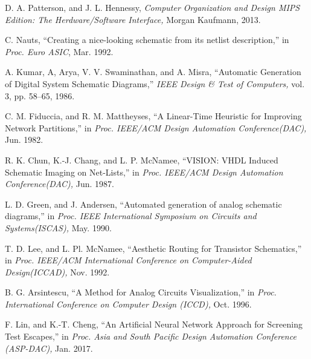 \documentclass[twocolumn]{article}
\makeatletter
\def\section{\@startsection {section}{1}{\z@}{20pt plus 2pt minus 2pt}
{8pt plus 2pt minus 2pt}{\centering\normalsize\sc
\edef\@svsec{\thesection.\ }}}
\def\thesection{\Roman{section}}
\makeatother
\begin{document}

\begin{thebibliography}{99}
\footnotesize

D. A. Patterson, and J. L. Hennessy,
{\em Computer Organization and Design MIPS Edition:
 The Herdware/Software Interface,}
Morgan Kaufmann, 2013.

C. Nauts,
``Creating a nice-looking schematic from its netlist description,''
in {\em Proc. Euro ASIC}, Mar. 1992.

A. Kumar, A, Arya, V. V. Swaminathan, and A. Misra,
``Automatic Generation of Digital System Schematic Diagrams,''
{\em IEEE Design \& Test of Computers,}
vol. 3, pp. 58--65, 1986.

C. M. Fiduccia, and R. M. Mattheyses,
``A Linear-Time Heuristic for Improving Network Partitions,''
in {\em Proc. IEEE/ACM Design Automation Conference(DAC),}
Jun. 1982.

R. K. Chun, K.-J. Chang, and L. P. McNamee,
``VISION: VHDL Induced Schematic Imaging on Net-Lists,''
in {\em Proc. IEEE/ACM Design Automation Conference(DAC),}
Jun. 1987.

L. D. Green, and J. Andersen,
``Automated generation of analog schematic diagrams,''
in {\em Proc. IEEE International Symposium on Circuits and Systems(ISCAS),}
May. 1990.

T. D. Lee, and L. Pl. McNamee,
``Aesthetic Routing for Transistor Schematics,''
in {\em Proc. IEEE/ACM International Conference
 on Computer-Aided Design(ICCAD),}
Nov. 1992.

B. G. Arsintescu,
``A Method for Analog Circuits Visualization,''
in {\em Proc. International Conference on Computer Design (ICCD),}
Oct. 1996.

F. Lin, and K.-T. Cheng,
``An Artificial Neural Network Approach for Screening Test Escapes,''
in {\em Proc. Asia and South Pacific Design Automation Conference (ASP-DAC),}
Jan. 2017.


\end{thebibliography}
\end{document}
